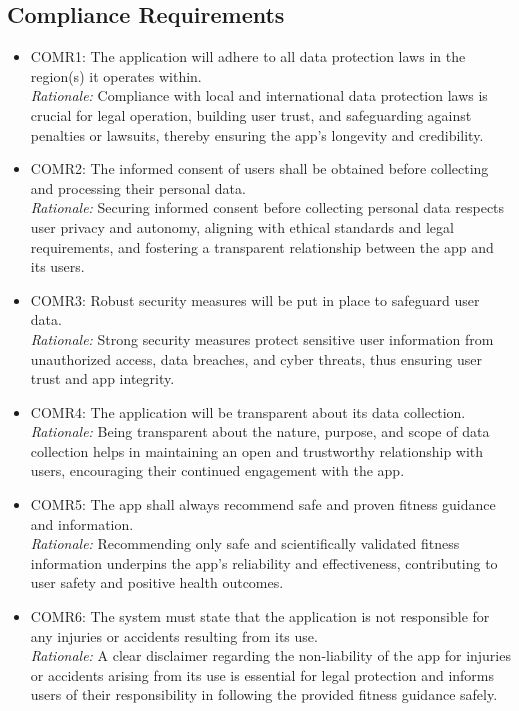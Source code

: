 \documentclass[12pt]{article}
\begin{document}
\subsection{Compliance Requirements}
\begin{itemize}
\item COMR1: The application will adhere to all data protection laws in the region(s) it operates within.\\
\textit{Rationale:} Compliance with local and international data protection laws is crucial for legal operation, building user trust, and safeguarding against penalties or lawsuits, thereby ensuring the app's longevity and credibility.
\item COMR2: The informed consent of users shall be obtained before collecting and processing their personal data.\\
\textit{Rationale:} Securing informed consent before collecting personal data respects user privacy and autonomy, aligning with ethical standards and legal requirements, and fostering a transparent relationship between the app and its users.
\item COMR3: Robust security measures will be put in place to safeguard user data.\\
\textit{Rationale:} Strong security measures protect sensitive user information from unauthorized access, data breaches, and cyber threats, thus ensuring user trust and app integrity.
\item COMR4: The application will be transparent about its data collection.\\
\textit{Rationale:} Being transparent about the nature, purpose, and scope of data collection helps in maintaining an open and trustworthy relationship with users, encouraging their continued engagement with the app.
\item COMR5: The app shall always recommend safe and proven fitness guidance and information.\\
\textit{Rationale:} Recommending only safe and scientifically validated fitness information underpins the app's reliability and effectiveness, contributing to user safety and positive health outcomes.
\item COMR6: The system must state that the application is not responsible for any injuries or accidents resulting from its use.\\
\textit{Rationale:} A clear disclaimer regarding the non-liability of the app for injuries or accidents arising from its use is essential for legal protection and informs users of their responsibility in following the provided fitness guidance safely.
\end{itemize}
\end{document}
